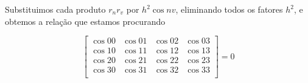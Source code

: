 Substituimos cada produto $r_nr_v$ por $h^2 \cos nv$, eliminando todos os fatores $h^2$, e obtemos a relação que estamos procurando

$$\left[
\begin{array}{cccc}
\cos 00 & \cos 01 & \cos 02 & \cos 03\\
\cos 10 & \cos 11 & \cos 12 & \cos 13\\
\cos 20 & \cos 21 & \cos 22 & \cos 23\\
\cos 30 & \cos 31 & \cos 32 & \cos 33\\
\end{array}
\right]=0$$


